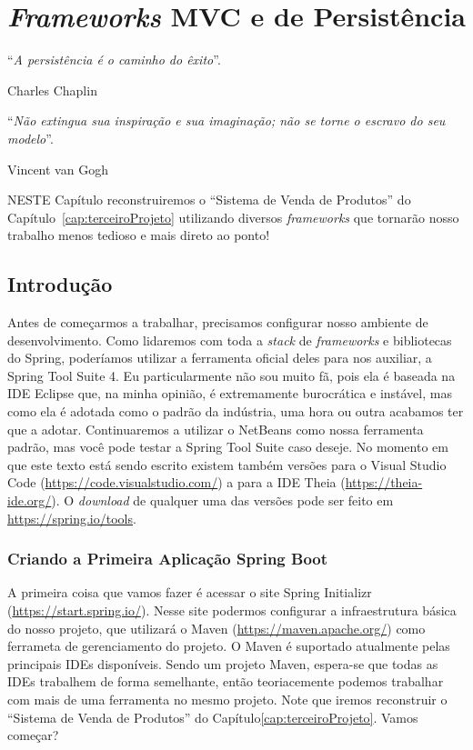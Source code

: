 \chapter{\textit{Frameworks} MVC e de Persistência}\label{cap:frameworksPersistencia}
\epigraph{``\textit{A persistência é o caminho do êxito}''.}{Charles Chaplin}
\epigraph{``\textit{Não extingua sua inspiração e sua imaginação; não se torne o escravo do seu modelo}''.}{Vincent van Gogh}

\lettrine[lines=4, lhang=0.1, lraise=0, loversize=0.2, findent=0.1em]{\textcolor{corTema}{N}}{ESTE} Capítulo reconstruiremos o ``Sistema de Venda de Produtos'' do Capítulo~\ref{cap:terceiroProjeto} utilizando diversos \textit{frameworks} que tornarão nosso trabalho menos tedioso e mais direto ao ponto!

\vfill

\section{Introdução}

Antes de começarmos a trabalhar, precisamos configurar nosso ambiente de desenvolvimento. Como lidaremos com toda a \textit{stack} de \textit{frameworks} e bibliotecas do Spring, poderíamos utilizar a ferramenta oficial deles para nos auxiliar, a Spring Tool Suite 4. Eu particularmente não sou muito fã, pois ela é baseada na IDE Eclipse que, na minha opinião, é extremamente burocrática e instável, mas como ela é adotada como o padrão da indústria, uma hora ou outra acabamos ter que a adotar. Continuaremos a utilizar o NetBeans como nossa ferramenta padrão, mas você pode testar a Spring Tool Suite caso deseje. No momento em que este texto está sendo escrito existem também versões para o Visual Studio Code (\url{https://code.visualstudio.com/}) a para a IDE Theia (\url{https://theia-ide.org/}). O \textit{download} de qualquer uma das versões pode ser feito em \url{https://spring.io/tools}.


\subsection{Criando a Primeira Aplicação Spring Boot}

A primeira coisa que vamos fazer é acessar o site Spring Initializr (\url{https://start.spring.io/}). Nesse site podermos configurar a infraestrutura básica do nosso projeto, que utilizará o Maven (\url{https://maven.apache.org/}) como ferrameta de gerenciamento do projeto. O Maven é suportado atualmente pelas principais IDEs disponíveis. Sendo um projeto Maven, espera-se que todas as IDEs trabalhem de forma semelhante, então teoriacemente podemos trabalhar com mais de uma ferramenta no mesmo projeto. Note que iremos reconstruir o ``Sistema de Venda de Produtos'' do Capítulo\ref{cap:terceiroProjeto}. Vamos começar?

